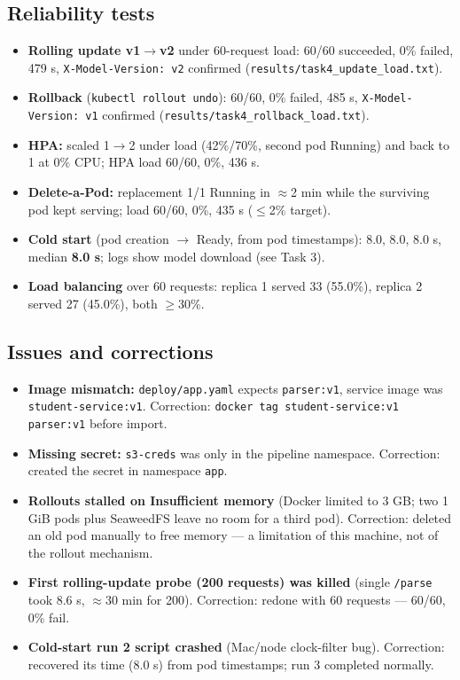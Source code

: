 \documentclass[11pt,a4paper]{article}
\begin{document}
\subsection*{Reliability tests}
\begin{itemize}
\item \textbf{Rolling update v1$\to$v2} under 60-request load: 60/60 succeeded, 0\% failed, 479 s, \texttt{X-Model-Version: v2} confirmed (\texttt{results/task4\_update\_load.txt}).
\item \textbf{Rollback} (\texttt{kubectl rollout undo}): 60/60, 0\% failed, 485 s, \texttt{X-Model-Version: v1} confirmed (\texttt{results/task4\_rollback\_load.txt}).
\item \textbf{HPA:} scaled 1$\to$2 under load (42\%/70\%, second pod Running) and back to 1 at 0\% CPU; HPA load 60/60, 0\%, 436 s.
\item \textbf{Delete-a-Pod:} replacement 1/1 Running in $\approx$2 min while the surviving pod kept serving; load 60/60, 0\%, 435 s ($\le$2\% target).
\item \textbf{Cold start} (pod creation $\to$ Ready, from pod timestamps): 8.0, 8.0, 8.0 s, median \textbf{8.0 s}; logs show model download (see Task 3).
\item \textbf{Load balancing} over 60 requests: replica 1 served 33 (55.0\%), replica 2 served 27 (45.0\%), both $\ge$30\%.
\end{itemize}
\subsection*{Issues and corrections}
\begin{itemize}
\item \textbf{Image mismatch:} \texttt{deploy/app.yaml} expects \texttt{parser:v1}, service image was \texttt{student-service:v1}. Correction: \texttt{docker tag student-service:v1 parser:v1} before import.
\item \textbf{Missing secret:} \texttt{s3-creds} was only in the pipeline namespace. Correction: created the secret in namespace \texttt{app}.
\item \textbf{Rollouts stalled on Insufficient memory} (Docker limited to 3 GB; two 1 GiB pods plus SeaweedFS leave no room for a third pod). Correction: deleted an old pod manually to free memory --- a limitation of this machine, not of the rollout mechanism.
\item \textbf{First rolling-update probe (200 requests) was killed} (single \texttt{/parse} took 8.6 s, $\approx$30 min for 200). Correction: redone with 60 requests --- 60/60, 0\% fail.
\item \textbf{Cold-start run 2 script crashed} (Mac/node clock-filter bug). Correction: recovered its time (8.0 s) from pod timestamps; run 3 completed normally.
\end{itemize}
\end{document}
